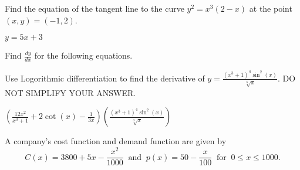 \documentclass[12pt,letterpaper,addpoints]{exam}
\begin{document}
\begin{questions}
\begin{parts}
\end{parts}

\question[5]  Find the equation of the tangent line to the curve $y^2=x^3(2-x)$ at the point $(x,y)=(-1,2)$.
\begin{solution}
$y=5x+3$
\end{solution}

\vfill


\newpage
\addpoints
\question Find $\displaystyle\frac{dy}{dx}$ for the following equations.


\question[5] Use Logorithmic differentiation to find the derivative of $y=\displaystyle \frac{\displaystyle(x^3+1)^4\sin^2(x)}{\displaystyle\sqrt[3]{x}}$.  DO NOT SIMPLIFY YOUR ANSWER.
\begin{solution}
$\displaystyle\left(\frac{12x^2}{x^3+1}+2\cot(x)-\frac{1}{3x} \right)\left(\frac{\displaystyle(x^3+1)^4\sin^2(x)}{\displaystyle\sqrt[3]{x}} \right)$
\end{solution}

\vfill

\newpage
\addpoints


\question A company's cost function and demand function are given by
$$
C(x) = 3800 + 5x-\frac{x^2}{1000} \;\;\text{and}\;\; p(x) = 50-\frac{x}{100} \;\; \text{for}\;\;0\leq x\leq 1000.
$$


\end{questions}
\end{document}
